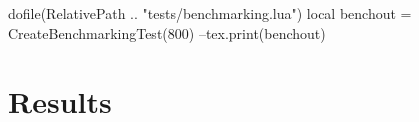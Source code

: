 \documentclass[oneside]{memoir}
\begin{document}
\pagestyle{empty}

\begin{luacode*}
	dofile(RelativePath .. "tests/benchmarking.lua")
	local benchout = CreateBenchmarkingTest(800)
	--tex.print(benchout)
\end{luacode*}

\chapter{Results}

\PrintRpgTexErrors

\PrintRpgTexBenchmarking
\end{document}
